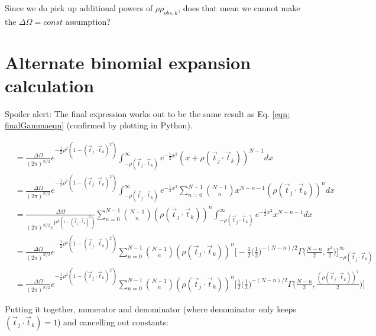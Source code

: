 \documentclass[12pt]{article}
\newcommand{\ptjtk}{\rho(\vec{t}_j\cdot\vec{t}_k)}
\newcommand{\tjtk}{(\vec{t}_j\cdot\vec{t}_k)}
\begin{document}
Since we do pick up additional powers of $\rho\rho_{obs,k}$, does that mean we cannot make the $\Delta\Omega=const$ assumption?

\section{Alternate binomial expansion calculation}\label{section:alternate_binomial_expansion_calculations}

Spoiler alert: The final expression works out to be the same result as Eq. \ref{eqn: finalGammaeqn} (confirmed by plotting in Python).

        \begin{align}
        &= \frac{\Delta\Omega}{(2\pi)^{N/2}} e^{-\frac{1}{2}\rho^2(1-(\vec{t}_j\cdot\vec{t}_k)^2)} \int_{-\ptjtk}^\infty  e^{-\frac{1}{2} x^2  } {(x+\ptjtk)^{N-1}} dx \\
        &= \frac{\Delta\Omega}{(2\pi)^{N/2}} e^{-\frac{1}{2}\rho^2(1-(\vec{t}_j\cdot\vec{t}_k)^2)} \int_{-\ptjtk}^\infty  e^{-\frac{1}{2} x^2  } {\sum_{n=0}^{N-1} \binom{N-1}{n}x^{N-n-1}(\ptjtk)^{n} } dx \\
        &= \frac{\Delta\Omega}{(2\pi)^{N/2}  e^{\frac{1}{2}\rho^2(1-(\vec{t}_j\cdot\vec{t}_k)^2)}}  \sum_{n=0}^{N-1} \binom{N-1}{n} (\ptjtk)^{n} \int_{-\ptjtk}^\infty e^{-\frac{1}{2} x^2  } x^{N-n-1}  dx \\
        &= \frac{\Delta\Omega}{(2\pi)^{N/2}} e^{-\frac{1}{2}\rho^2(1-(\vec{t}_j\cdot\vec{t}_k)^2)}  \sum_{n=0}^{N-1} \binom{N-1}{n} (\ptjtk)^{n} 
          \Big[
            -\frac{1}{2}\Big(\frac{1}{2}\Big)^{-(N-n)/2}\Gamma\Big(\frac{N-n}{2},\frac{x^2}{2}\Big)
          \Big]^{\infty}_{-\ptjtk} \\
        &= \frac{\Delta\Omega}{(2\pi)^{N/2}} e^{-\frac{1}{2}\rho^2(1-(\vec{t}_j\cdot\vec{t}_k)^2)}  \sum_{n=0}^{N-1} \binom{N-1}{n} (\ptjtk)^{n} 
          \Big[
            \frac{1}{2}\Big(\frac{1}{2}\Big)^{-(N-n)/2}\Gamma\Big(\frac{N-n}{2},\frac{(\ptjtk)^2}{2}\Big)
          \Big]
        \end{align}

Putting it together, numerator and denominator (where denominator only keeps $\tjtk=1$) and cancelling out constants:
\end{document}
